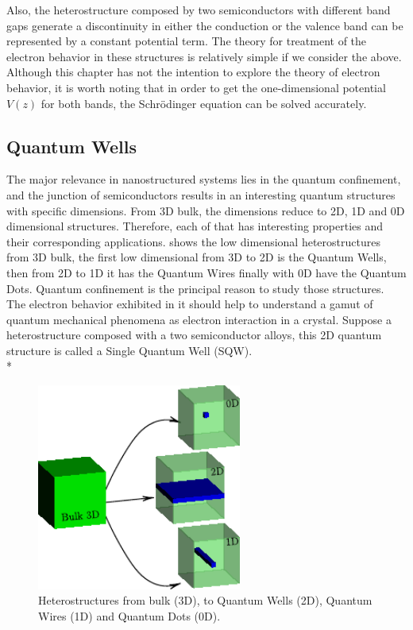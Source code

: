 Also, the heterostructure composed by two semiconductors with different band gaps generate a discontinuity in either the conduction or the valence band can be represented by a constant potential term\cite{harrison2016quantum}.  The theory for treatment of the electron behavior in these structures is relatively simple if we consider the above. 
Although this chapter has not the intention to explore the theory of electron behavior, it is worth noting that in order to get the one-dimensional potential $V(z)$ for both bands,  the Schr\"odinger equation can be solved accurately. 

\subsection{Quantum Wells}
\label{subsection:chapter-1-quantum-wells}
\vspace{-10mm} 
The major relevance in nanostructured systems lies in the quantum confinement, and 
the junction of semiconductors results in an interesting quantum structures with specific
dimensions. From 3D bulk, the dimensions reduce to 2D, 1D and 0D dimensional structures.
Therefore, each of that has interesting properties and their corresponding applications. 
 shows the low dimensional heterostructures from 3D bulk, the first low dimensional from 3D to 2D is the Quantum Wells, then from 2D to 1D it has the
Quantum Wires finally with 0D have the Quantum Dots. Quantum confinement is the principal reason to study those structures. The electron behavior exhibited in it should help to understand a gamut of quantum mechanical phenomena as electron interaction in a crystal. Suppose a heterostructure composed with a two
semiconductor alloys, this 2D quantum structure is called a Single Quantum
Well (SQW).\\*
\begin{figure}
	\centering
	\includegraphics[width=0.6\textwidth]{../figures/chapter-1/heterostructures/build-ruco/lds-00}
	\caption{Heterostructures from bulk (3D), to Quantum Wells (2D), Quantum Wires (1D) and Quantum Dots (0D).  }
	\label{fig:subsection-1.2-heterostructures}
\end{figure}
